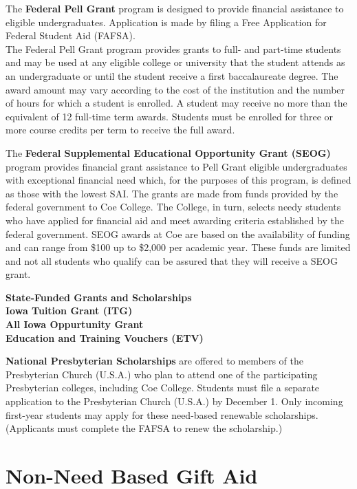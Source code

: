 \documentclass[
  letterpaper,
]{scrbook}
\begin{document}
The \textbf{Federal Pell Grant} program is designed to provide financial
assistance to eligible undergraduates. Application is made by filing a
Free Application for Federal Student Aid (FAFSA).\\
The Federal Pell Grant program provides grants to full- and part-time
students and may be used at any eligible college or university that the
student attends as an undergraduate or until the student receive a first
baccalaureate degree. The award amount may vary according to the cost of
the institution and the number of hours for which a student is enrolled.
A student may receive no more than the equivalent of 12 full-time term
awards. Students must be enrolled for three or more course credits per
term to receive the full award.

The \textbf{Federal Supplemental Educational Opportunity Grant (SEOG)}
program provides financial grant assistance to Pell Grant eligible
undergraduates with exceptional financial need which, for the purposes
of this program, is defined as those with the lowest SAI. The grants are
made from funds provided by the federal government to Coe College. The
College, in turn, selects needy students who have applied for financial
aid and meet awarding criteria established by the federal government.
SEOG awards at Coe are based on the availability of funding and can
range from \$100 up to \$2,000 per academic year. These funds are
limited and not all students who qualify can be assured that they will
receive a SEOG grant.

\textbf{State-Funded Grants and Scholarships}\\
\textbf{Iowa Tuition Grant (ITG)}\\
\textbf{All Iowa Oppurtunity Grant}\\
\textbf{Education and Training Vouchers (ETV)}

\textbf{National Presbyterian Scholarships} are offered to members of
the Presbyterian Church (U.S.A.) who plan to attend one of the
participating Presbyterian colleges, including Coe College. Students
must file a separate application to the Presbyterian Church (U.S.A.) by
December 1. Only incoming first-year students may apply for these
need-based renewable scholarships. (Applicants must complete the FAFSA
to renew the scholarship.)

\section{Non-Need Based Gift Aid}\label{non-need-based-gift-aid}
\end{document}
